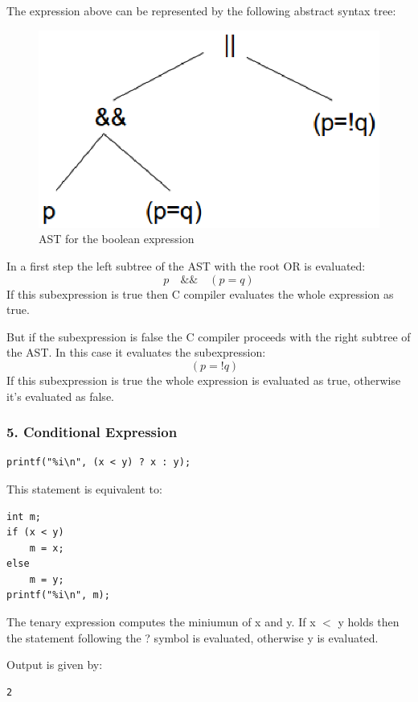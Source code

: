 \documentclass[12pt]{article}
\begin{document}
The expression above can be represented by the following abstract syntax tree:
\begin{figure}[!htb]
\centering
\includegraphics[scale=0.5]{tree.eps} 
\caption{AST for the boolean expression}
\end{figure}


In a first step the left subtree of the AST with the root OR is evaluated:
\begin{equation}
p \quad \&\& \quad (p=q)
\end{equation}
If this subexpression is true then C compiler evaluates the whole expression as true.

But if the subexpression is false the C compiler proceeds with the right subtree of the AST. In this case it evaluates the subexpression:
\begin{equation}
 \quad (p = !q)
\end{equation}
If this subexpression is true the whole expression is evaluated as true, otherwise it's evaluated as false.

\newpage
\subsubsection*{5. Conditional Expression}
\begin{lstlisting}
printf("%i\n", (x < y) ? x : y);
\end{lstlisting}
This statement is equivalent to:
\begin{lstlisting}
int m;
if (x < y)
	m = x;
else 
	m = y;
printf("%i\n", m);
\end{lstlisting}
The tenary expression computes the miniumun of x and y. If x $<$ y holds then the statement following the ? symbol is evaluated, otherwise y is evaluated.

Output is given by:
\begin{lstlisting}
2
\end{lstlisting}
\end{document}
